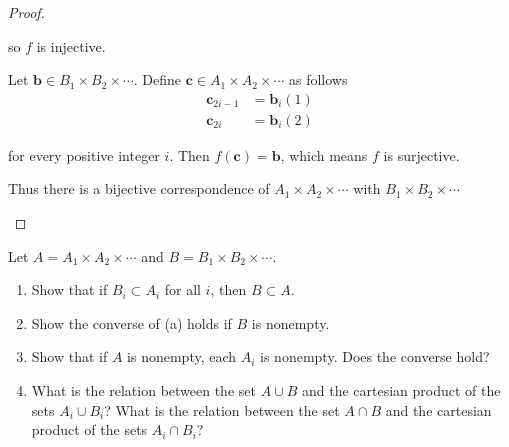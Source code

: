 \begin{proof}
\begin{enumerate}[label={(\alph*)}]
              so $f$ is injective.

              Let $\mathbf{b}\in B_{1}\times B_{2}\times \cdots$. Define $\mathbf{c}\in A_{1}\times A_{2}\times \cdots$ as follows
              \begin{align*}
                  \mathbf{c}_{2i-1} & = \mathbf{b}_{i}(1) \\
                  \mathbf{c}_{2i}   & = \mathbf{b}_{i}(2)
              \end{align*}

              for every positive integer $i$. Then $f(\mathbf{c}) = \mathbf{b}$, which means $f$ is surjective.

              Thus there is a bijective correspondence of $A_{1}\times A_{2}\times \cdots$ with $B_{1}\times B_{2}\times \cdots$
    \end{enumerate}
\end{proof}

\begin{exercise}\label{chapter1:section5:exercise3}
    Let $A = A_{1}\times A_{2}\times \cdots$ and $B = B_{1}\times B_{2}\times\cdots$.
    \begin{enumerate}[label={(\alph*)}]
        \item Show that if $B_{i}\subset A_{i}$ for all $i$, then $B\subset A$.
        \item Show the converse of (a) holds if $B$ is nonempty.
        \item Show that if $A$ is nonempty, each $A_{i}$ is nonempty. Does the converse hold?
        \item What is the relation between the set $A\cup B$ and the cartesian product of the sets $A_{i}\cup B_{i}$? What is the relation between the set $A\cap B$ and the cartesian product of the sets $A_{i}\cap B_{i}$?
    \end{enumerate}
\end{exercise}

